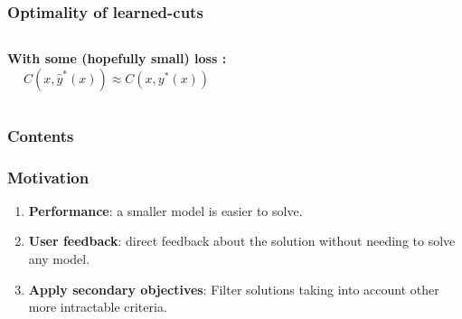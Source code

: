 \begin{frame}
\frametitle{\textbf{Optimality of learned-cuts}}

  \begin{columns}[c]
    \textbf{With some (hopefully small) loss :}
    \begin{equation*}
      C(x,\hat{y}^{*}(x)) \approx  C(x,y^{*}(x))
    \end{equation*}
  \end{columns}
\end{frame}

\begin{frame}
\frametitle{\textbf{Contents}}
  \begin{block}{\textbf{\secondtitleF}}
  \end{block}  

  \begin{block}{\textbf{\secondtitleS}}
  \end{block}  
\end{frame}

\begin{frame}
\frametitle{\textbf{Motivation}}
  
  \pause
  \begin{enumerate}[<+->]

  \item
    \textbf{Performance}: a smaller model is easier to solve.
  \item
    \textbf{User feedback}: direct feedback about the solution without
    needing to solve any model.
  \item
    \textbf{Apply secondary objectives}: Filter solutions taking into account other more intractable criteria.
  \end{enumerate}
\end{frame}

